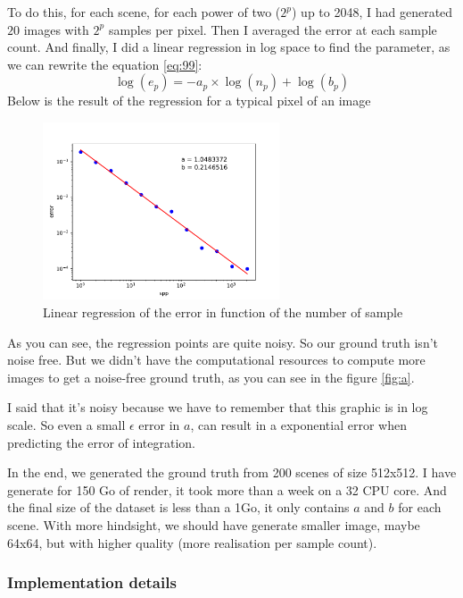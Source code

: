\documentclass{classeENS}
\begin{document}
\par To do this, for each scene, for each power of two 
($2^p$) up to 2048, I had generated $20$ images with $2^p$ 
samples per pixel. Then I averaged the error at each sample count. 
And finally, I did a linear regression in log space to find the 
parameter, as we can rewrite the equation
\ref{eq:99}:
\[ \log(e_p) = -a_p\times \log(n_p) + \log(b_p)\]
Below is the result of the regression for a typical pixel of an image
\begin{figure}[H]
    \centering
    \caption{Linear regression of the error in function of the number of sample}
    \includegraphics[width=70mm]{image/without/plotsobol.pdf}
\end{figure}
As you can see, the regression points are quite noisy. So our 
ground truth isn't noise free. But we didn't have the 
computational resources to compute more images to get a 
noise-free ground truth, as you can see in the figure \ref{fig:a}.
\par I said that it's noisy because we have to remember that this graphic is in log scale.
So even a small $\epsilon$ error in $a$, can result in a exponential error when predicting 
the error of integration. 

\par In the end, we generated the ground truth from 200 scenes of size 512x512.
I have generate for 150 Go of render, it took more than a week on a 32 CPU core. 
And the final size of the dataset is less than a 1Go, it only contains $a$ and $b$ for each scene. 
With more hindsight, we should have generate smaller image, maybe 64x64, but with higher quality
(more realisation per sample count).

\subsubsection{Implementation details}
\end{document}

